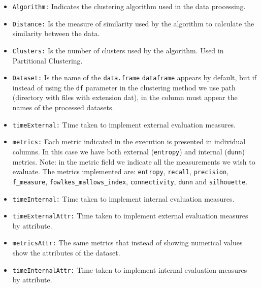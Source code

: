 \begin{itemize}
  \item \texttt{Algorithm:} Indicates the clustering algorithm used in the data processing.
  \item \texttt{Distance:} Is the measure of similarity used by the algorithm to calculate the similarity between the data.
  \item \texttt{Clusters:} Is the number of clusters used by the algorithm. Used in Partitional Clustering.
  \item \texttt{Dataset:} Is the name of the \texttt{data.frame} \texttt{dataframe} appears by default, but if instead of using the \texttt{df} parameter in the clustering method we use path (directory with files with extension dat), in the column must appear the names of the processed datasets.
  \item \texttt{timeExternal:} Time taken to implement external evaluation measures.
  \item \texttt{metrics:} Each metric indicated in the execution is presented in individual columns. In this case we have both external (\texttt{entropy}) and internal (\texttt{dunn}) metrics.
  Note: in the metric field we indicate all the measurements we wish to evaluate. The metrics implemented are: \texttt{entropy}, \texttt{recall}, \texttt{precision}, \texttt{f\_measure}, \texttt{fowlkes\_mallows\_index}, \texttt{connectivity}, \texttt{dunn} and \texttt{silhouette}.
  \item \texttt{timeInternal:} Time taken to implement internal evaluation measures.
  \item \texttt{timeExternalAttr:} Time taken to implement external evaluation measures by attribute.
  \item \texttt{metricsAttr:} The same metrics that instead of showing numerical values show the attributes of the dataset.
  \item \texttt{timeInternalAttr:} Time taken to implement internal evaluation measures by attribute.
\end{itemize}

